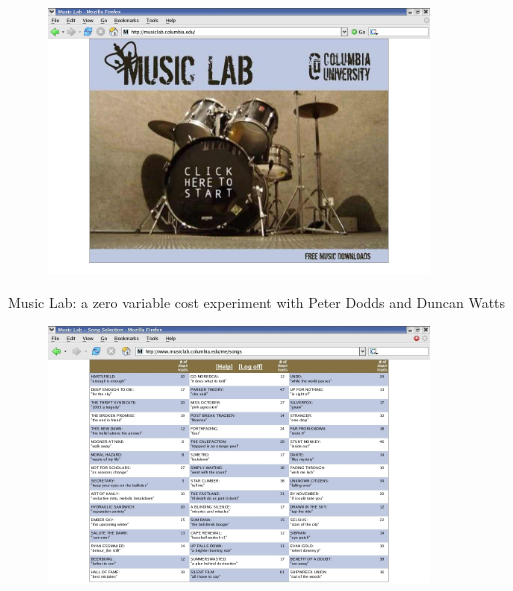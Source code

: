\documentclass[aspectratio=169]{beamer}
\begin{document}
\begin{frame}

\begin{figure}
  \centering
  \includegraphics[width = 0.9\textwidth]{figures/splashscreen}
\end{figure}

Music Lab: a zero variable cost experiment with Peter Dodds and Duncan Watts

\end{frame}
\begin{frame}

\begin{figure}
  \centering
  \includegraphics[width = 0.9\textwidth]{figures/info-v1-cut}
\end{figure}

\end{frame}
\end{document}

